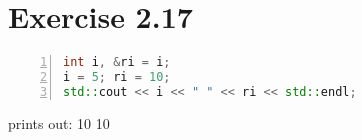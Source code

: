 \documentclass{article}
\begin{document}
    
\section*{Exercise 2.17}

\begin{lstlisting}[language=C++, numbers=left, xleftmargin=2em, basicstyle=\ttfamily, showstringspaces=false]
int i, &ri = i;
i = 5; ri = 10;
std::cout << i << " " << ri << std::endl;
\end{lstlisting}

\begin{flushleft}
prints out: 10 10
\end{flushleft}
\end{document}
